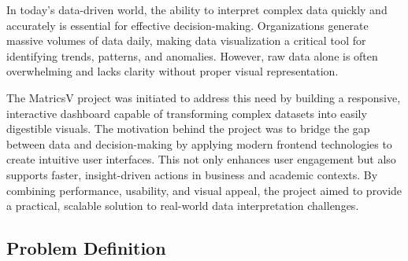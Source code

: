 




In today's data-driven world, the ability to interpret complex data quickly and accurately is essential for effective decision-making. Organizations generate massive volumes of data daily, making data visualization a critical tool for identifying trends, patterns, and anomalies. However, raw data alone is often overwhelming and lacks clarity without proper visual representation.

The MatricsV project was initiated to address this need by building a responsive, interactive dashboard capable of transforming complex datasets into easily digestible visuals. The motivation behind the project was to bridge the gap between data and decision-making by applying modern frontend technologies to create intuitive user interfaces. This not only enhances user engagement but also supports faster, insight-driven actions in business and academic contexts. By combining performance, usability, and visual appeal, the project aimed to provide a practical, scalable solution to real-world data interpretation challenges.





\subsection{Problem Definition }

